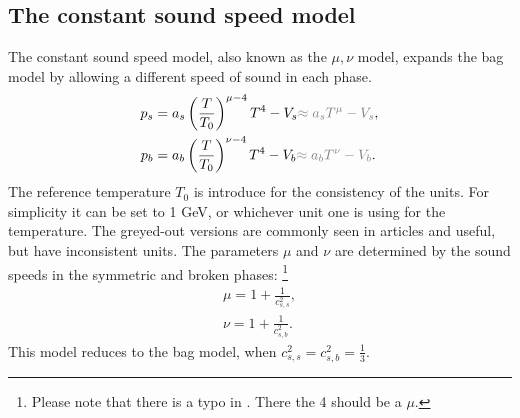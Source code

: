 \subsection{The constant sound speed model}
The constant sound speed model, also known as the $\mu, \nu$ model,
expands the bag model by allowing a different speed of sound in each phase.
\cites[eq. 15]{giese_2021}[eq. 38]{giese_2020}
\begin{align}
p_s &= a_s \left( \frac{T}{T_0} \right)^{\mu-4} T^4 - V_s {\color{gray} \approx a_s T^\mu - V_s }, \\
p_b &= a_b \left( \frac{T}{T_0} \right)^{\nu-4} T^4 - V_b {\color{gray} \approx a_b T^\nu - V_b}.
\end{align}
The reference temperature $T_0$ is introduce for the consistency of the units.
For simplicity it can be set to 1 GeV, or whichever unit one is using for the temperature.
The greyed-out versions are commonly seen in articles and useful, but have inconsistent units.
The parameters $\mu$ and $\nu$ are determined by the sound speeds in the symmetric and broken phases:
\cites[eq. 16]{giese_2021}[eq. 39]{giese_2020}
\footnote{Please note that there is a typo in \cite[eq. 15]{giese_2021}. There the 4 should be a $\mu$.}
\begin{align}
\mu = 1 + \frac{1}{c_{s,s}^2}, \\
\nu = 1 + \frac{1}{c_{s,b}^2}.
\end{align}
This model reduces to the bag model,
when $c_{s,s}^2 = c_{s,b}^2 = \frac{1}{3}$.

